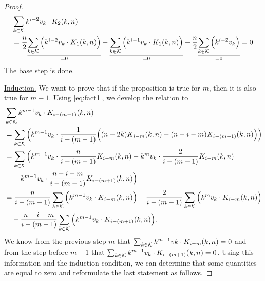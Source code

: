 \begin{proof}
    \begin{equation*}
    \begin{split}
        &\sum_{k \in \mathcal{K}} k^{i-2}v_k \cdot K_{2}(k, n)\\
        &= \frac{n}{2}\underset{=0}{\underline{\sum_{k \in \mathcal{K}} \Big( k^{i-2}v_k \cdot K_1(k, n) \Big)}} - \underset{=0}{\underline{\sum_{k \in \mathcal{K}} \Big( k^{i-1}v_k \cdot K_1(k,n) \Big)}} - \frac{n}{2}\underset{=0}{\underline{\sum_{k \in \mathcal{K}} \Big( k^{i-2}v_k \Big)}} = 0.
    \end{split}
    \end{equation*}
    The base step is done.

    \underline{Induction.} We want to prove that if the proposition is true for $m$, then it is also true for $m - 1$. Using \cref{eq:fact1}, we develop the relation to
    \begin{equation*}
        \begin{split}
            & \sum_{k \in \mathcal{K}} k^{m-1}v_k \cdot K_{i-(m-1)}(k,n)\\
            &= \sum_{k \in \mathcal{K}} \Big( k^{m-1}v_k \cdot \frac{1}{i-(m-1)}\Big( (n-2k)K_{i-m}(k,n) - (n-i-m)K_{i-(m+1)}(k,n) \Big)\Big)\\
            &= \sum_{k \in \mathcal{K}} \Big( k^{m-1}v_k \cdot \frac{n}{i-(m-1)}K_{i-m}(k,n) - k^m v_k \cdot \frac{2}{i-(m-1)}K_{i-m}(k,n)\\
            &\quad -k^{m-1}v_k \cdot\frac{n-i-m}{i-(m-1)}K_{i-(m+1)}(k,n) \Big)\\
            &= \frac{n}{i-(m-1)}\sum_{k \in \mathcal{K}} \Big(k^{m-1}v_k\cdot K_{i-m}(k,n) \Big) - \frac{2}{i-(m-1)}\sum_{k \in \mathcal{K}} \Big(k^mv_k\cdot K_{i-m}(k,n)\Big)\\
            &\quad -\frac{n-i-m}{i-(m-1)}\sum_{k \in \mathcal{K}}\Big(k^{m-1}v_k\cdot K_{i-(m+1)}(k,n)\Big).
        \end{split}
    \end{equation*}
    We know from the previous step $m$ that $\sum_{k \in \mathcal{K}} k^{m-1}vk\cdot K_{i-m}(k,n) = 0$ and from the step before $m+1$ that $\sum_{k \in \mathcal{K}} k^{m-1}v_k\cdot K_{i-(m+1)}(k,n) = 0$. Using this information and the induction condition, we can determine that some quantities are equal to zero and reformulate the last statement as follows.


\end{proof}
